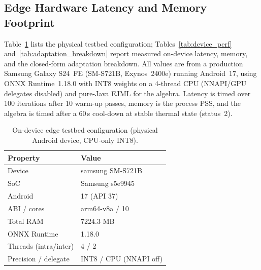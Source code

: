 \documentclass[preprint,12pt]{elsarticle}
\begin{document}
\subsection{Edge Hardware Latency and Memory Footprint}
\label{sec:edge_hardware}
Table~\ref{tab:device_spec} lists the physical testbed configuration; Tables~\ref{tab:device_perf} and~\ref{tab:adaptation_breakdown} report measured on-device latency, memory, and the closed-form adaptation breakdown. All values are from a production Samsung Galaxy S24~FE (SM-S721B, Exynos~2400e) running Android~17, using ONNX Runtime~1.18.0 with INT8 weights on a 4-thread CPU (NNAPI/GPU delegates disabled) and pure-Java EJML for the algebra. Latency is timed over 100 iterations after 10 warm-up passes, memory is the process PSS, and the algebra is timed after a 60\,s cool-down at stable thermal state (status~2).

\begin{table}[htbp]
\centering
\caption{On-device edge testbed configuration (physical Android device, CPU-only INT8).}
\label{tab:device_spec}
\small
\begin{tabular}{ll}
\toprule
Property & Value \\
\midrule
Device & samsung SM-S721B \\
SoC & Samsung s5e9945 \\
Android & 17 (API 37) \\
ABI / cores & arm64-v8a / 10 \\
Total RAM & 7224.3 MB \\
ONNX Runtime & 1.18.0 \\
Threads (intra/inter) & 4 / 2 \\
Precision / delegate & INT8 / CPU (NNAPI off) \\
\bottomrule
\end{tabular}
\end{table}
\end{document}
